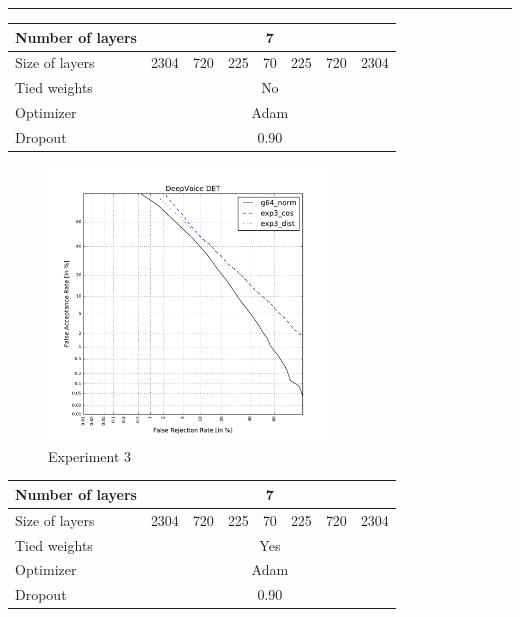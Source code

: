\documentclass[conference]{IEEEtran}
\begin{document}
\hrule
\vspace{0.5cm}

\begin{table}[!h]
\centering
\begin{tabular}{|l|c|c|c|c|c|c|c|}
\hline
Number of layers & \multicolumn{7}{c|}{7}                \\ \hline
Size of layers   & 2304 & 720 & 225 & 70 & 225 & 720 & 2304  \\ \hline
Tied weights     & \multicolumn{7}{c|}{No}               \\ \hline
Optimizer        & \multicolumn{7}{c|}{Adam} \\ \hline
Dropout          & \multicolumn{7}{c|}{0.90} \\ \hline
\end{tabular}
\end{table}

\begin{figure}[!h]
    \centering
    \includegraphics[width=7.5cm]{../scores/det3.pdf}
    \captionsetup{labelformat=empty}
    \caption{Experiment 3}
\end{figure}


\newpage

\begin{table}[!h]
\centering
\begin{tabular}{|l|c|c|c|c|c|c|c|}
\hline
Number of layers & \multicolumn{7}{c|}{7}                \\ \hline
Size of layers   & 2304 & 720 & 225 & 70 & 225 & 720 & 2304  \\ \hline
Tied weights     & \multicolumn{7}{c|}{Yes}               \\ \hline
Optimizer        & \multicolumn{7}{c|}{Adam} \\ \hline
Dropout          & \multicolumn{7}{c|}{0.90} \\ \hline
\end{tabular}
\end{table}
\end{document}
